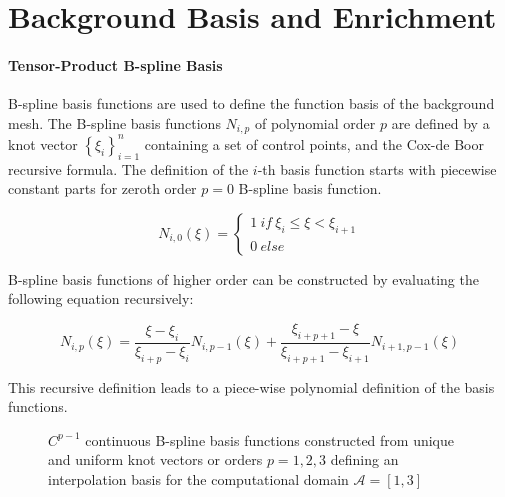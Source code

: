 \section{Background Basis and Enrichment}
\label{sec:overview_background}

\paragraph{Tensor-Product B-spline Basis}
B-spline basis functions are used to define the function basis of the background mesh. 
The B-spline basis functions $N_{i,p}$ of polynomial order $p$ are defined by a knot vector $\left\{\xi_i\right\}_{i = 1}^{n}$ containing a set of control points, and the Cox-de Boor recursive formula.  The definition of the $i$-th basis function starts with piecewise constant parts for zeroth order $p=0$ B-spline basis function.

\vspace*{0.3cm}

\begin{equation} 
\label{eqn:BasisP0}
    N_{i,0}(\xi) = 
    \left\{
    \begin{array}{ll}1 \ if \ \xi_i \leq \xi < \xi_{i+1}\\  0\ else\end{array}
    \right.
\end{equation} 

B-spline basis functions of higher order can be constructed by evaluating the following equation recursively:
    
\begin{equation}
\label{eqn:CoxBoor}
    N_{i,p}(\xi) = 
    \frac{\xi - \xi_i}{\xi_{i+p} - \xi_i} N_{i,p-1}(\xi) + 
    \frac{\xi_{i+p+1} - \xi}{\xi_{i+p+1} - \xi_{i+1}} N_{i+1,p-1}(\xi)
\end{equation}

This recursive definition leads to a piece-wise polynomial definition of the basis functions. 

\begin{figure}[H]
    \begin{center}
    \def\svgwidth{13.0cm}
    
    \caption{$C^{p-1}$ continuous B-spline basis functions constructed from unique and uniform knot vectors or orders $p = {1,2,3}$ defining an interpolation basis for the computational domain $\mathcal{A} = [1,3]$} 
    \label{fig:Bsp_basis}
    \end{center}
\end{figure}

